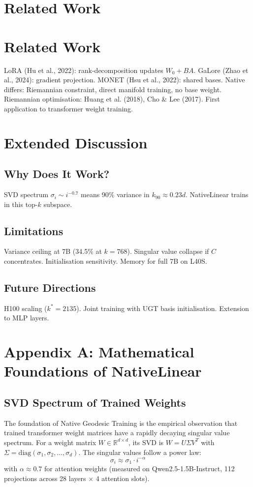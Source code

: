 \documentclass[11pt]{article}
\begin{document}
\section{Related Work}


\section{Related Work}
LoRA (Hu et al., 2022): rank-decomposition updates $W_0 + BA$. GaLore (Zhao et al., 2024): gradient projection. MONET (Hsu et al., 2022): shared bases. Native differs: Riemannian constraint, direct manifold training, no base weight. Riemannian optimisation: Huang et al. (2018), Cho \& Lee (2017). First application to transformer weight training.

\section{Extended Discussion}
\subsection{Why Does It Work?}
SVD spectrum $\sigma_i \sim i^{-0.7}$ means 90\% variance in $k_{90} \approx 0.23d$. NativeLinear trains in this top-$k$ subspace.

\subsection{Limitations}
Variance ceiling at 7B (34.5\% at $k=768$). Singular value collapse if $C$ concentrates. Initialisation sensitivity. Memory for full 7B on L40S.

\subsection{Future Directions}
H100 scaling ($k^*=2135$). Joint training with UGT basis initialisation. Extension to MLP layers.


\section{Appendix A: Mathematical Foundations of NativeLinear}

\subsection{SVD Spectrum of Trained Weights}

The foundation of Native Geodesic Training is the empirical observation that trained transformer weight matrices have a rapidly decaying singular value spectrum. For a weight matrix $W \in \mathbb{R}^{d \times d}$, its SVD is $W = U \Sigma V^T$ with $\Sigma = \mathrm{diag}(\sigma_1, \sigma_2, \ldots, \sigma_d)$. The singular values follow a power law:
\begin{equation}
\sigma_i \approx \sigma_1 \cdot i^{-\alpha}
\end{equation}
with $\alpha \approx 0.7$ for attention weights (measured on Qwen2.5-1.5B-Instruct, 112 projections across 28 layers $\times$ 4 attention slots).
\end{document}
